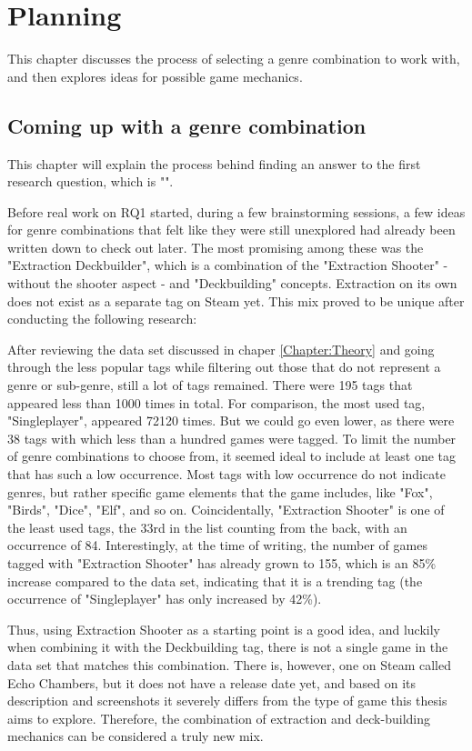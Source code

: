 \chapter{Planning} \label{Chapter:Planning}


This chapter discusses the process of selecting a genre combination to work with, and then explores ideas for possible game mechanics.


\section{Coming up with a genre combination}

This chapter will explain the process behind finding an answer to the first research question, which is "\researchQuestionOne".

Before real work on RQ1 started, during a few brainstorming sessions, a few ideas for genre combinations that felt like they were still unexplored had already been written down to check out later. The most promising among these was the "Extraction Deckbuilder", which is a combination of the "Extraction Shooter" - without the shooter aspect - and "Deckbuilding" concepts. Extraction on its own does not exist as a separate tag on Steam yet. This mix proved to be unique after conducting the following research:

After reviewing the data set discussed in chaper \ref{Chapter:Theory} and going through the less popular tags while filtering out those that do not represent a genre or sub-genre, still a lot of tags remained. There were 195 tags that appeared less than 1000 times in total. For comparison, the most used tag, "Singleplayer", appeared 72120 times. But we could go even lower, as there were 38 tags with which less than a hundred games were tagged. To limit the number of genre combinations to choose from, it seemed ideal to include at least one tag that has such a low occurrence. Most tags with low occurrence do not indicate genres, but rather specific game elements that the game includes, like "Fox", "Birds", "Dice", "Elf", and so on. Coincidentally, "Extraction Shooter" is one of the least used tags, the 33rd in the list counting from the back, with an occurrence of 84. Interestingly, at the time of writing, the number of games tagged with "Extraction Shooter" has already grown to 155, which is an 85\% increase compared to the data set, indicating that it is a trending tag (the occurrence of "Singleplayer" has only increased by 42\%).

Thus, using Extraction Shooter as a starting point is a good idea, and luckily when combining it with the Deckbuilding tag, there is not a single game in the data set that matches this combination. There is, however, one on Steam called Echo Chambers, but it does not have a release date yet, and based on its description and screenshots it severely differs from the type of game this thesis aims to explore. Therefore, the combination of extraction and deck-building mechanics can be considered a truly new mix.



